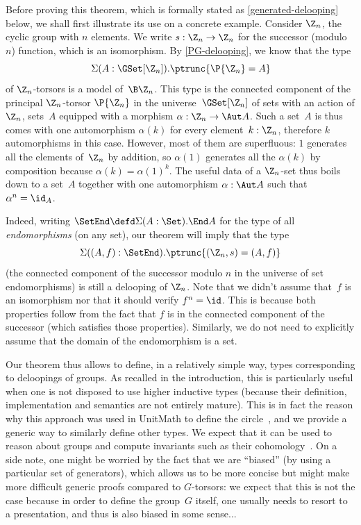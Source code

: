 Before proving this theorem, which is formally stated as
\cref{generated-delooping} below, we shall first illustrate its use on a
concrete example. Consider $\Z_n$, the cyclic group with $n$ elements. We write
$s:\Z_n\to\Z_n$ for the successor (modulo $n$) function, which is an
isomorphism. By \cref{PG-delooping}, we know that the type
\[
  \Sigma(A:\GSet[\Z_n]).\ptrunc{\P{\Z_n}=A}
\]
of $\Z_n$-torsors is a model of~$\B\Z_n$.
%
This type is the connected component of the principal $\Z_n$-torsor $\P{\Z_n }$
in the universe~$\GSet[\Z_n]$ of sets with an action of $\Z_n$, \ie
sets~$A$ equipped with a morphism $ \alpha:\Z_n\to\Aut A $. Such a set~$A$ is
thus comes with one automorphism $\alpha(k)$ for every element~$k:\Z_n$,
therefore $k$ automorphisms in this case. However, most of them are superfluous:
$1$ generates all the elements of~$\Z_n$ by addition, so $\alpha(1)$
generates all the $\alpha(k)$ by composition because $\alpha(k)=\alpha(1)^k$.
%
The useful data of a $\Z_n$-set thus boils down to a set~$A$ together with one
automorphism $\alpha:\Aut A$ such that $\alpha^n=\id_A$.

Indeed, writing
$
  \SetEnd
  \defd
  \Sigma(A:\Set).\End A
$
for the type of all \emph{endomorphisms} (on any set), our theorem will imply
that the type
\begin{equation}
  \label{Zn-delooping}
  \Sigma((A,f):\SetEnd).\ptrunc{(\Z_n,s)=(A,f)}
\end{equation}
(the connected component of the successor modulo $n$ in the universe of set
endomorphisms) is still a delooping of $\Z_n$. Note that we didn't assume
that~$f$ is an isomorphism nor that it should verify $f^n=\id$. This is because
both properties follow from the fact that $f$ is in the connected component of
the successor (which satisfies those properties). Similarly, we do not need to
explicitly assume that the domain of the endomorphism is a set.

Our theorem thus allows to define, in a relatively simple way, types
corresponding to deloopings of groups. As recalled in the introduction, this is
particularly useful when one is not disposed to use higher inductive types
(\eg because their definition, implementation and semantics are not entirely
mature). This is in fact the reason why this approach was used in UnitMath to
define the circle~\cite{bezem2021construction}, and we provide a generic way to
similarly define other types.
%
We expect that it can be used to reason about groups and compute invariants such as their cohomology~\cite{cavallo2015synthetic,buchholtz2020cellular,brunerie2022synthetic}.
%
On a side note, one might be worried by the fact that we are ``biased'' (by
using a particular set of generators), which allows us to be more concise but
might make more difficult generic proofs compared to $G$-torsors: we expect that
this is not the case because in order to define the group~$G$ itself, one
usually needs to resort to a presentation, and thus is also biased in some sense...

